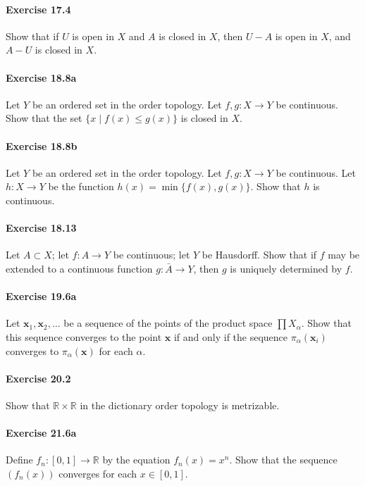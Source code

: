 \documentclass{article}
\begin{document}
\paragraph{Exercise 17.4} Show that if $U$ is open in $X$ and $A$ is closed in $X$, then $U-A$ is open in $X$, and $A-U$ is closed in $X$.


\paragraph{Exercise 18.8a} Let $Y$ be an ordered set in the order topology. Let $f, g: X \rightarrow Y$ be continuous. Show that the set $\{x \mid f(x) \leq g(x)\}$ is closed in $X$.


\paragraph{Exercise 18.8b} Let $Y$ be an ordered set in the order topology. Let $f, g: X \rightarrow Y$ be continuous. Let $h: X \rightarrow Y$ be the function $h(x)=\min \{f(x), g(x)\}.$ Show that $h$ is continuous.


\paragraph{Exercise 18.13} Let $A \subset X$; let $f: A \rightarrow Y$ be continuous; let $Y$ be Hausdorff. Show that if $f$ may be extended to a continuous function $g: \bar{A} \rightarrow Y$, then $g$ is uniquely determined by $f$.


\paragraph{Exercise 19.6a} Let $\mathbf{x}_1, \mathbf{x}_2, \ldots$ be a sequence of the points of the product space $\prod X_\alpha$.  Show that this sequence converges to the point $\mathbf{x}$ if and only if the sequence $\pi_\alpha(\mathbf{x}_i)$ converges to $\pi_\alpha(\mathbf{x})$ for each $\alpha$.


\paragraph{Exercise 20.2} Show that $\mathbb{R} \times \mathbb{R}$ in the dictionary order topology is metrizable.


\paragraph{Exercise 21.6a} Define $f_{n}:[0,1] \rightarrow \mathbb{R}$ by the equation $f_{n}(x)=x^{n}$. Show that the sequence $\left(f_{n}(x)\right)$ converges for each $x \in[0,1]$.
\end{document}
